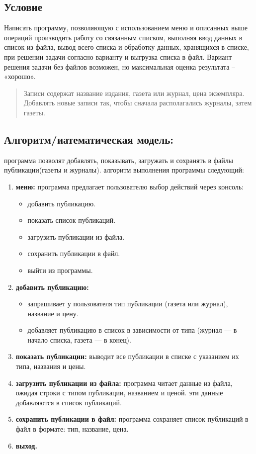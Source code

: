 \documentclass[14pt,a4paper]{article}
\begin{document}
\subsection{Условие}
Написать программу, позволяющую с использованием меню и описанных выше операций
производить работу со связанным списком, выполняя ввод данных в список из файла,
вывод всего списка и обработку данных, хранящихся в списке, при решении задачи
согласно варианту и выгрузка списка в файл. Вариант решения задачи без файлов
возможен, но максимальная оценка результата – «хорошо».
\begin{quote}
Записи содержат название издания, газета или журнал, цена экземпляра. Добавлять
новые записи так, чтобы сначала располагались журналы, затем газеты.
\end{quote}
\subsection{Алгоритм/иатематическая модель:}
программа позволят добавлять, показывать, загружать и сохранять в файлы
публикации(газеты и журналы). алгоритм выполнения программы
следующий:
\begin{enumerate}
\item \textbf{меню:} программа предлагает пользователю выбор действий через консоль:
\begin{itemize}
\item добавить публикацию.
\item показать список публикаций.
\item загрузить публикации из файла.
\item сохранить публикации в файл.
\item выйти из программы.
\end{itemize}
\item \textbf{добавить публикацию:}
\begin{itemize}
\item запрашивает у пользователя тип публикации (газета или журнал), название и цену.
\item добавляет публикацию в список в зависимости от типа (журнал — в начало списка, газета — в конец).
\end{itemize}
\item \textbf{показать публикации:} выводит все публикации в списке с указанием их типа, названия и цены.
\item \textbf{загрузить публикации из файла:} программа читает данные из файла,
ожидая строки с типом публикации, названием и ценой. эти данные добавляются в
список публикаций.
\item \textbf{сохранить публикации в файл:} программа сохраняет список
публикаций в файл в формате: тип, название, цена.
\item \textbf{выход.}
\end{enumerate}
\end{document}
